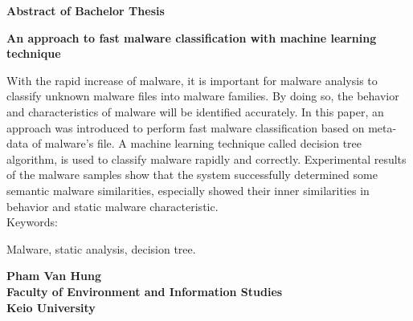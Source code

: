 ﻿\begin{center}


\begin{Large}
{\bf Abstract of Bachelor Thesis} \\

\vspace{5mm}

{\bf An approach to fast malware classification with machine learning technique}
\end{Large}
\end{center}

\vspace{0.8cm}
 
  With the rapid increase of malware, it is important for malware analysis to classify unknown malware files into malware families. By doing so, the behavior and characteristics of malware will be identified accurately. In this paper, an approach was introduced to perform fast malware classification based on meta-data of malware's file. A machine learning technique called decision tree algorithm, is used to classify malware rapidly and correctly. Experimental results of the malware samples show that the system successfully determined some semantic malware similarities, especially showed their inner similarities in behavior and static malware characteristic.  \\

Keywords:

Malware, static analysis, decision tree.

\vspace{0.5cm}

\begin{flushright}
{\bf Pham Van Hung}\\
\vspace{2mm}
{\bf Faculty of Environment and Information Studies}\\
{\bf Keio University}\\
\end{flushright}